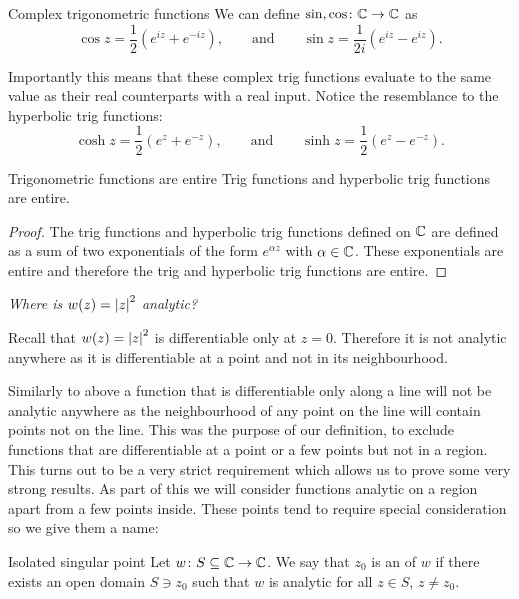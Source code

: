 \documentclass{article}
\begin{document}
    \begin{definition}{Complex trigonometric functions}{}
        We can define \(\sin, \cos\colon\mathbb{C}\to\mathbb{C}\) as
        \[\cos z = \frac{1}{2}(e^{iz} + e^{-iz}), \qquad\text{and}\qquad \sin z = \frac{1}{2i}(e^{iz} - e^{iz}).\]
    \end{definition}
    Importantly this means that these complex trig functions evaluate to the same value as their real counterparts with a real input.
    Notice the resemblance to the hyperbolic trig functions:
    \[\cosh z = \frac{1}{2}(e^{z} + e^{-z}), \qquad\text{and}\qquad \sinh z = \frac{1}{2}(e^z - e^{-z}).\]
    \begin{corollary}{Trigonometric functions are entire}{}
        Trig functions and hyperbolic trig functions are entire.
    \end{corollary}
    \begin{proof}
        The trig functions and hyperbolic trig functions defined on \(\mathbb{C}\) are defined as a sum of two exponentials of the form \(e^{\alpha z}\) with \(\alpha\in\mathbb{C}\).
        These exponentials are entire and therefore the trig and hyperbolic trig functions are entire.
    \end{proof}
    \begin{example}
        \textit{Where is \(w(z) = \abs{z}^2\) analytic?}
        
        Recall that \(w(z) = \abs{z}^2\) is differentiable only at \(z = 0\).
        Therefore it is not analytic anywhere as it is differentiable at a point and not in its neighbourhood.
    \end{example}
    Similarly to above a function that is differentiable only along a line will not be analytic anywhere as the neighbourhood of any point on the line will contain points not on the line.
    This was the purpose of our definition, to exclude functions that are differentiable at a point or a few points but not in a region.
    This turns out to be a very strict requirement which allows us to prove some very strong results.
    As part of this we will consider functions analytic on a region apart from a few points inside.
    These points tend to require special consideration so we give them a name:
    \begin{definition}{Isolated singular point}{}
        Let \(w\colon S\subseteq\mathbb{C}\to\mathbb{C}\).
        We say that \(z_0\) is an  of \(w\) if there exists an open domain \(S\ni z_0\) such that \(w\) is analytic for all \(z\in S\), \(z \ne z_0\).
    \end{definition}
\end{document}
